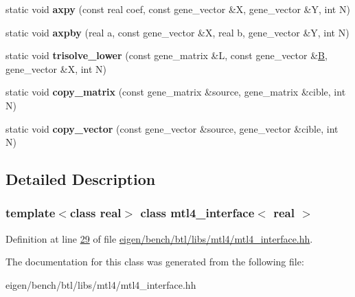 \begin{DoxyCompactItemize}
static void {\bfseries axpy} (const real coef, const gene\+\_\+vector \&X, gene\+\_\+vector \&Y, int N)
\item 
\mbox{\label{classmtl4__interface_af925280e0c44856358a54d81a34aad09}} 
static void {\bfseries axpby} (real a, const gene\+\_\+vector \&X, real b, gene\+\_\+vector \&Y, int N)
\item 
\mbox{\label{classmtl4__interface_a51283dd52248d281f0e9f47a6ced9824}} 
static void {\bfseries trisolve\+\_\+lower} (const gene\+\_\+matrix \&L, const gene\+\_\+vector \&\hyperlink{group___core___module_class_eigen_1_1_matrix}{B}, gene\+\_\+vector \&X, int N)
\item 
\mbox{\label{classmtl4__interface_a18f1be3a3856f6832bab6c574bee15a5}} 
static void {\bfseries copy\+\_\+matrix} (const gene\+\_\+matrix \&source, gene\+\_\+matrix \&cible, int N)
\item 
\mbox{\label{classmtl4__interface_a085ae5e0c9dab9baa3294f37afb6cd04}} 
static void {\bfseries copy\+\_\+vector} (const gene\+\_\+vector \&source, gene\+\_\+vector \&cible, int N)
\end{DoxyCompactItemize}


\subsection{Detailed Description}
\subsubsection*{template$<$class real$>$\newline
class mtl4\+\_\+interface$<$ real $>$}



Definition at line \hyperlink{eigen_2bench_2btl_2libs_2mtl4_2mtl4__interface_8hh_source_l00029}{29} of file \hyperlink{eigen_2bench_2btl_2libs_2mtl4_2mtl4__interface_8hh_source}{eigen/bench/btl/libs/mtl4/mtl4\+\_\+interface.\+hh}.



The documentation for this class was generated from the following file\+:\begin{DoxyCompactItemize}
\item 
eigen/bench/btl/libs/mtl4/mtl4\+\_\+interface.\+hh\end{DoxyCompactItemize}

